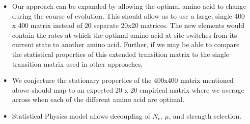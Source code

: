 \documentclass{article}
\newcommand{\Ne}{\ensuremath{{N_e}}\xspace} %
\begin{document}
\begin{itemize}
\begin{enumerate}
  \end{enumerate}
\item Our approach can be expanded by allowing the optimal amino acid to change during the course of evolution.
This should allow us to use a large, single 400 x 400 matrix instead of 20 separate 20x20 matrices.
The new elements would contain the rates at which the optimal amino acid at site switches from its current state to another amino acid.
Further, if we may be able to compare the statistical properties of this extended transition matrix to the single transition matrix used in other approaches.
\item We conjecture the stationary properties of the 400x400 matrix mentioned above should map to an expected 20 x 20 empirical matrix where we average across when each of the different amino acid are optimal.
\item Statistical Physics model allows decoupling of \Ne, $\mu$, and strength selection.
\end{itemize}
\end{document}
